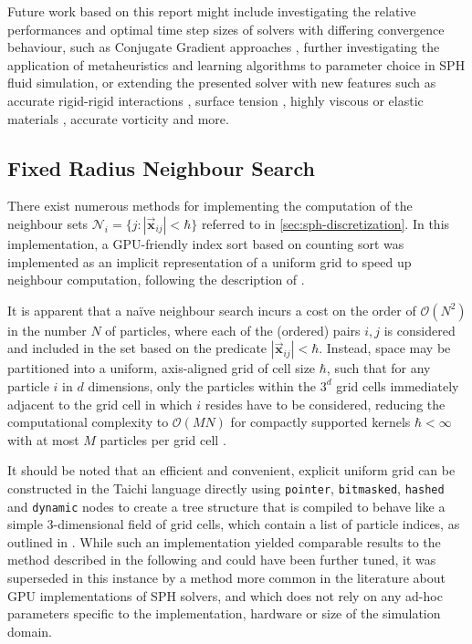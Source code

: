 \documentclass[oneside, a4paper]{book}
\newcommand\abs[1]{\left|#1\right|}
\newcommand\vek[1]{\vec{\bm{#1}}}
\newcommand\br[1]{\left(#1\right)}
\begin{document}
  Future work based on this report might include investigating the relative performances and optimal time step sizes of solvers with differing convergence behaviour, such as Conjugate Gradient approaches \autocites{monolithic-rigids-timo}{iisph}, further investigating the application of metaheuristics and learning algorithms to parameter choice in SPH fluid simulation, or extending the presented solver with new features such as accurate rigid-rigid interactions \autocite{monolithic-rigids-timo}, surface tension \autocite{unified-surftension-pressure-friction-timo}, highly viscous \autocite{weiler-implicit-viscosity} or elastic materials \autocite{implicit-linearly-elastic-solids}, accurate vorticity \autocite{turbulent-micropolar-foam} and more.

\begin{appendices}
    \chapter{Fixed Radius Neighbour Search}\label{appendix:fixed-radius-neighbour-search}
    There exist numerous methods for implementing the computation of the neighbour sets $\mathcal{N}_i = \{j : \abs{\vek{x}_{ij}}<\hbar\}$ referred to in \autoref{sec:sph-discretization}. In this implementation, a GPU-friendly index sort based on counting sort was implemented as an implicit representation of a uniform grid to speed up neighbour computation, following the description of \autocite[Hoetzlein]{hoetzlein-rama-counting-sort}. 

    It is apparent that a na\"ive neighbour search incurs a cost on the order of $\mathcal{O}\br{N^2}$ in the number $N$ of particles, where each of the (ordered) pairs $i,j$ is considered and included in the set based on the predicate $\abs{\vek{x}_{ij}}<\hbar$. Instead, space may be partitioned into a uniform, axis-aligned grid of cell size $\hbar$, such that for any particle $i$ in $d$ dimensions, only the particles within the $3^d$ grid cells immediately adjacent to the grid cell in which $i$ resides have to be considered, reducing the computational complexity to $\mathcal{O}(MN)$ for compactly supported kernels $\hbar<\infty$ with at most $M$ particles per grid cell \autocite{tutorial2019}. 
    
    It should be noted that an efficient and convenient, explicit uniform grid can be constructed in the Taichi language directly using \texttt{pointer}, \texttt{bitmasked}, \texttt{hashed} and \texttt{dynamic} nodes to create a tree structure that is compiled to behave like a simple 3-dimensional field of grid cells, which contain a list of particle indices, as outlined in \cite[this paper]{taichi-sparse}. While such an implementation yielded comparable results to the method described in the following and could have been further tuned, it was superseded in this instance by a method more common in the literature about GPU implementations of SPH solvers, and which does not rely on any ad-hoc parameters specific to the implementation, hardware or size of the simulation domain.


\end{appendices}
\end{document}
